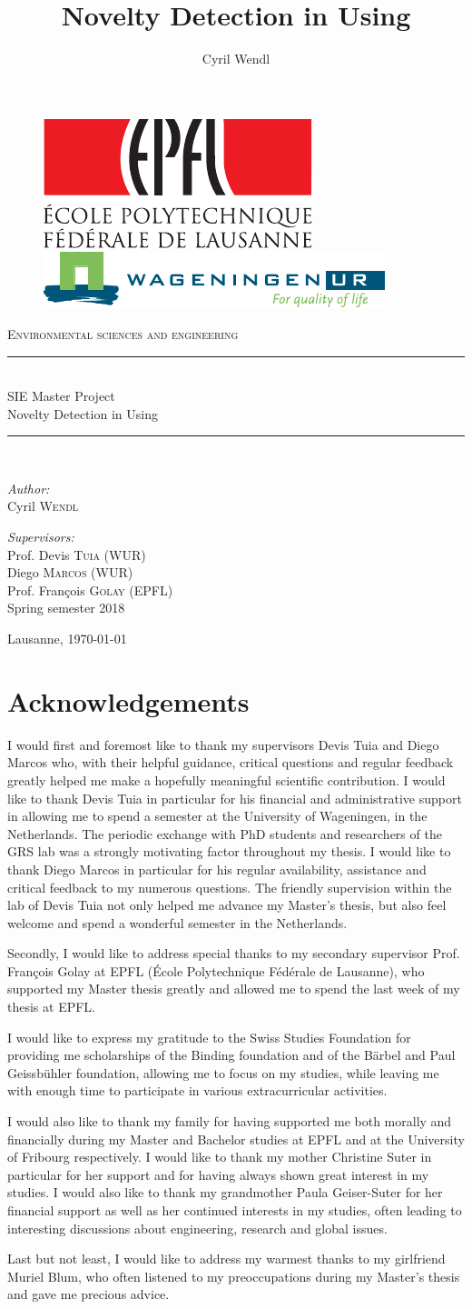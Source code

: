 \documentclass[10pt]{article}
\author{Cyril Wendl}
\title{Novelty Detection in \acrlongpl{CNN} Using \acrlongpl{DF}
}
\newcommand{\maketitlepage}{
    \begin{titlepage}
    	\begin{center}
    		\begin{figure}[H]
    			\centering
    			\includegraphics[height=.09\textwidth]{logo} 
    			\hspace{1cm}
    			\includegraphics[height=.07\textwidth]{logo_wur_quality_of_life}
    		\end{figure}
    		\textsc{Environmental sciences and engineering}\\[0.5cm]
    		
    		\newcommand{\HRule}{\rule{\linewidth}{0.2mm}}
    		\HRule \\[0.5cm]
    		{\large SIE Master Project}\\[0.2cm]
    		{\huge Novelty Detection in \acrlongpl{CNN} Using \acrlongpl{DF}
    		}\\[0.5cm]
    		\HRule \\[0.5cm]
    		
    		\begin{minipage}[t]{0.45\textwidth}
    			\begin{flushleft} \large
    				\emph{Author:}\\[0.2cm]
    				Cyril \textsc{Wendl}
    			\end{flushleft}
    		\end{minipage}
    		\hfill
    		\begin{minipage}[t]{0.45\textwidth}
    			\begin{flushright} \large
    				\emph{Supervisors:}\\[0.2cm]
    				Prof. Devis \textsc{Tuia} (WUR)\\
    				Diego \textsc{Marcos} (WUR)\\
    				Prof. François \textsc{Golay} (EPFL)\\
    				Spring semester 2018
    			\end{flushright}
    		\end{minipage}
    		\vfill
    		
    		{\large Lausanne, \today}
    	\end{center}
    \end{titlepage}
}
\begin{document}
\maketitlepage


\thispagestyle{empty}
\section*{Acknowledgements}
I would first and foremost like to thank my supervisors Devis Tuia and Diego Marcos who, with their helpful guidance, critical questions and regular feedback greatly helped me make a hopefully meaningful scientific contribution. I would like to thank Devis Tuia in particular for his financial and administrative support in allowing me to spend a semester at the University of Wageningen, in the Netherlands. The periodic exchange with PhD students and researchers of the GRS lab was a strongly motivating factor throughout my thesis. I would like to thank Diego Marcos in particular for his regular availability, assistance and critical feedback to my numerous questions. The friendly supervision within the lab of Devis Tuia not only helped me advance my Master's thesis, but also feel welcome and spend a wonderful semester in the Netherlands.

Secondly, I would like to address special thanks to my secondary supervisor Prof. François Golay at EPFL (École Polytechnique Fédérale de Lausanne), who supported my Master thesis greatly and allowed me to spend the last week of my thesis at EPFL.

I would like to express my gratitude to the Swiss Studies Foundation for providing me scholarships of the Binding foundation and of the Bärbel and Paul Geissbühler foundation, allowing me to focus on my studies, while leaving me with enough time to participate in various extracurricular activities.

I would also like to thank my family for having supported me both morally and financially during my Master and Bachelor studies at EPFL and at the University of Fribourg respectively. I would like to thank my mother Christine Suter in particular for her support and for having always shown great interest in my studies. I would also like to thank my grandmother Paula Geiser-Suter for her financial support as well as her continued interests in my studies, often leading to interesting discussions about engineering, research and global issues.

Last but not least, I would like to address my warmest thanks to my girlfriend Muriel Blum, who often listened to my preoccupations during my Master's thesis and gave me precious advice. 
\end{document}
